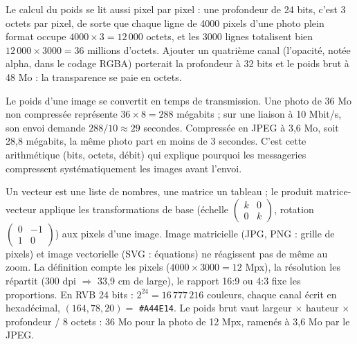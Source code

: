 Le calcul du poids se lit aussi pixel par pixel : une profondeur de 24 bits, c'est 3 octets par pixel, de sorte que chaque ligne de 4000 pixels d'une photo plein format occupe $4000 \times 3 = 12\,000$ octets, et les 3000 lignes totalisent bien $12\,000 \times 3000 = 36$ millions d'octets. Ajouter un quatrième canal (l'opacité, notée alpha, dans le codage RGBA) porterait la profondeur à 32 bits et le poids brut à 48 Mo : la transparence se paie en octets.

\begin{remarque}
Le poids d'une image se convertit en temps de transmission. Une photo de 36 Mo non compressée représente $36 \times 8 = 288$ mégabits ; sur une liaison à 10 Mbit/s, son envoi demande $288 / 10 \approx 29$ secondes. Compressée en JPEG à 3{,}6 Mo, soit 28,8 mégabits, la même photo part en moins de 3 secondes. C'est cette arithmétique (bits, octets, débit) qui explique pourquoi les messageries compressent systématiquement les images avant l'envoi.
\end{remarque}

\begin{aretirer}
Un vecteur est une liste de nombres, une matrice un tableau ; le produit matrice-vecteur applique les transformations de base (échelle $\begin{pmatrix} k & 0 \\ 0 & k \end{pmatrix}$, rotation $\begin{pmatrix} 0 & -1 \\ 1 & 0 \end{pmatrix}$) aux pixels d'une image. Image matricielle (JPG, PNG : grille de pixels) et image vectorielle (SVG : équations) ne réagissent pas de même au zoom. La définition compte les pixels ($4000 \times 3000 = 12$ Mpx), la résolution les répartit ($300$ dpi $\Rightarrow$ 33{,}9 cm de large), le rapport 16:9 ou 4:3 fixe les proportions. En RVB 24 bits : $2^{24} = 16\,777\,216$ couleurs, chaque canal écrit en hexadécimal, $(164, 78, 20) = $ \texttt{\#A44E14}. Le poids brut vaut largeur $\times$ hauteur $\times$ profondeur / 8 octets : 36 Mo pour la photo de 12 Mpx, ramenés à 3{,}6 Mo par le JPEG.
\end{aretirer}


